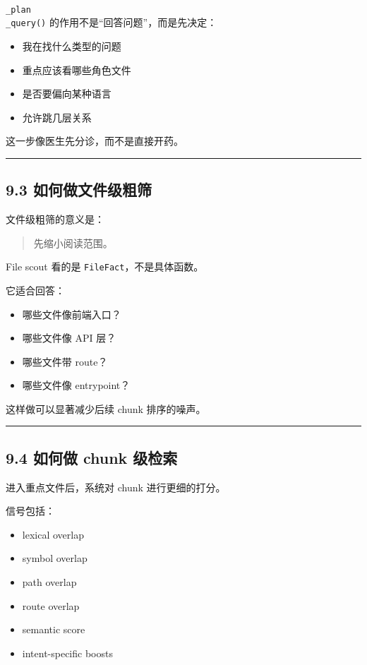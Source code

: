 \documentclass[UTF8,12pt,openany]{ctexbook}
\begin{document}
\texttt{\\_plan\\_query()} 的作用不是“回答问题”，而是先决定：\par

\begin{itemize}
\item 我在找什么类型的问题
\item 重点应该看哪些角色文件
\item 是否要偏向某种语言
\item 允许跳几层关系
\end{itemize}

这一步像医生先分诊，而不是直接开药。\par

\hrule

\subsection{9.3 如何做文件级粗筛}

文件级粗筛的意义是：\par

\begin{quote}
先缩小阅读范围。
\end{quote}

File scout 看的是 \texttt{FileFact}，不是具体函数。  \par
它适合回答：\par

\begin{itemize}
\item 哪些文件像前端入口？
\item 哪些文件像 API 层？
\item 哪些文件带 route？
\item 哪些文件像 entrypoint？
\end{itemize}

这样做可以显著减少后续 chunk 排序的噪声。\par

\hrule

\subsection{9.4 如何做 chunk 级检索}

进入重点文件后，系统对 chunk 进行更细的打分。\par

信号包括：\par

\begin{itemize}
\item lexical overlap
\item symbol overlap
\item path overlap
\item route overlap
\item semantic score
\item intent-specific boosts
\end{itemize}
\end{document}
